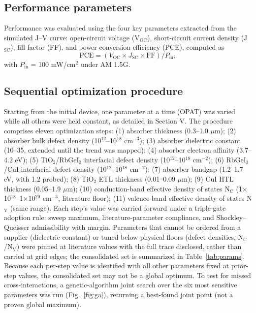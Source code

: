 \documentclass[aip,jap,amsmath,amssymb,preprint]{revtex4-2}
\begin{document}
\subsection{Performance parameters}
Performance was evaluated using the four key parameters extracted from the simulated J--V curve: open-circuit voltage (V$_{\mathrm{OC}}$), short-circuit current density (J$_{\mathrm{SC}}$), fill factor (FF), and power conversion efficiency (PCE), computed as
\begin{equation}\label{eq:pce}
\mathrm{PCE} = (V_{\mathrm{OC}} \times J_{\mathrm{SC}} \times \mathrm{FF})/P_{\mathrm{in}},
\end{equation}
with $P_{\mathrm{in}}$ = 100 mW/cm$^{2}$ under AM 1.5G.

\subsection{Sequential optimization procedure}
Starting from the initial device, one parameter at a time (OPAT) was varied while all others were held constant, as detailed in Section V.
The procedure comprises eleven optimization steps: (1) absorber thickness (0.3--1.0 $\mu$m); (2) absorber bulk defect density (10$^{12}$--10$^{18}$ cm$^{-3}$); (3) absorber dielectric constant (10--35, extended until the trend was mapped); (4) absorber electron affinity (3.7--4.2 eV); (5) TiO$_{2}$/RbGeI$_{3}$ interfacial defect density (10$^{12}$--10$^{18}$ cm$^{-2}$); (6) RbGeI$_{3}$/CuI interfacial defect density (10$^{12}$--10$^{18}$ cm$^{-2}$); (7) absorber bandgap (1.2--1.7 eV, with 1.2 probed); (8) TiO$_{2}$ ETL thickness (0.01--0.09 $\mu$m); (9) CuI HTL thickness (0.05--1.9 $\mu$m); (10) conduction-band effective density of states N$_{\mathrm{C}}$ (1$\times$10$^{18}$--1$\times$10$^{20}$ cm$^{-3}$, literature floor); (11) valence-band effective density of states N$_{\mathrm{V}}$ (same range). Each step's value was carried forward under a triple-gate adoption rule: sweep maximum, literature-parameter compliance, and Shockley--Queisser admissibility with margin. Parameters that cannot be ordered from a supplier (dielectric constant) or tuned below physical floors (defect densities, N$_{\mathrm{C}}$/N$_{\mathrm{V}}$) were pinned at literature values with the full trace disclosed, rather than carried at grid edges; the consolidated set is summarized in Table~\ref{tab:params}.
Because each per-step value is identified with all other parameters fixed at prior-step values, the consolidated set may not be a global optimum. To test for missed cross-interactions, a genetic-algorithm joint search over the six most sensitive parameters was run (Fig.~\ref{fig:ga}), returning a best-found joint point (not a proven global maximum).
\end{document}
